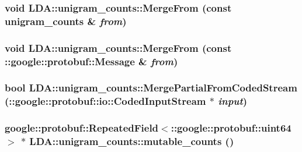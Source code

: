 \label{class_l_d_a_1_1unigram__counts_a44f18118e62e545c714c7d946f664a81}
\hypertarget{class_l_d_a_1_1unigram__counts_a254666bf8fa7ee639bd2843a87585f23}{
\subsubsection[{MergeFrom}]{\setlength{\rightskip}{0pt plus 5cm}void LDA::unigram\_\-counts::MergeFrom (const {\bf unigram\_\-counts} \& {\em from})}}
\label{class_l_d_a_1_1unigram__counts_a254666bf8fa7ee639bd2843a87585f23}
\hypertarget{class_l_d_a_1_1unigram__counts_a22b8f2a7a881a008c9af79b3c0f0a8aa}{
\subsubsection[{MergeFrom}]{\setlength{\rightskip}{0pt plus 5cm}void LDA::unigram\_\-counts::MergeFrom (const ::google::protobuf::Message \& {\em from})}}
\label{class_l_d_a_1_1unigram__counts_a22b8f2a7a881a008c9af79b3c0f0a8aa}
\hypertarget{class_l_d_a_1_1unigram__counts_abaae2e29e04f31deb16bf83d4de032a5}{
\subsubsection[{MergePartialFromCodedStream}]{\setlength{\rightskip}{0pt plus 5cm}bool LDA::unigram\_\-counts::MergePartialFromCodedStream (::google::protobuf::io::CodedInputStream $\ast$ {\em input})}}
\label{class_l_d_a_1_1unigram__counts_abaae2e29e04f31deb16bf83d4de032a5}
\hypertarget{class_l_d_a_1_1unigram__counts_a28ad79f31ea7a42f773e4346e75cc11b}{
\subsubsection[{mutable\_\-counts}]{\setlength{\rightskip}{0pt plus 5cm}google::protobuf::RepeatedField$<$::google::protobuf::uint64 $>$ $\ast$ LDA::unigram\_\-counts::mutable\_\-counts ()}}
